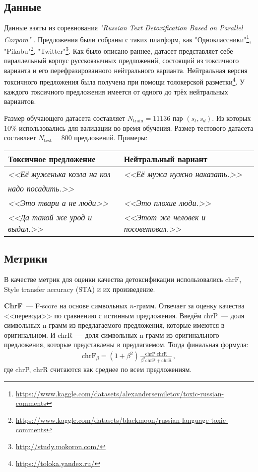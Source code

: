 \subsection{Данные}
Данные взяты из соревнования \textit{"Russian Text Detoxification Based on Parallel Corpora"} \cite{russe_data}.
Предложения были собраны с таких платформ, как 
"Одноклассники"\footnote{\url{https://www.kaggle.com/datasets/alexandersemiletov/toxic-russian-comments}}, 
"Pikabu"\footnote{\url{https://www.kaggle.com/datasets/blackmoon/russian-language-toxic-comments}}, 
"Twitter"\footnote{\url{http://study.mokoron.com/}}.
Как было описано раннее, датасет представляет себе параллельный корпус русскоязычных предложений, состоящий из токсичного варианта и его перефразированного нейтрального варианта. 
Нейтральная версия токсичного предложения была получена при помощи толокерской разметки\footnote{\url{https://toloka.yandex.ru/}}. 
У каждого токсичного предложения имеется от одного до трёх нейтральных вариантов. 

Размер обучающего датасета составляет $N_{\text{train}} = 11136$ пар $\left(s_t, s_d \right)$.
Из которых $10\%$ использовались для валидации во время обучения.
Размер тестового датасета составляет $N_{\text{test}} = 800$ предложений.
Примеры: 
\begin{table}[ht]
\centering
 \begin{tabular}{|l|l|} 
 \hline
 Токсичное предложение & Нейтральный вариант \\ [0.5ex] 
 \hline
 \textit{<<Её муженька козла на кол} & \textit{<<Её мужа нужно наказать.>>} \\
 \textit{надо посадить.>>} &  \\
 \textit{<<Это твари а не люди>>} & \textit{<<Это плохие люди.>>} \\
 \textit{<<Да такой же урод и выдал.>>} & \textit{<<Этот же человек и посоветовал.>>} \\
 \hline
 \end{tabular}
\end{table}

\subsection{Метрики}
В качестве метрик для оценки качества детоксификации использовались chrF\cite{popovic-2015-chrf}, Style transfer accuracy (STA) и их произведение.

\textbf{ChrF}~--- F-score на основе символьных $n$-грамм.
Отвечает за оценку качества <<перевода>> по сравнению с истинным предложения.
Введём chrP~--- доля символьных n-грамм из предлагаемого предложения, которые имеются в оригинальном.
И chrR~--- доля символьных n-грамм из оригинального предложения, которые представлены в предлагаемом. 
Тогда финальная формула:
\begin{gather*}
    \text{chrF}_{\beta} = (1 + \beta^2) \frac{\text{chrP} \cdot \text{chrR}}{\beta^2 \text{chrP} + \text{chrR}},
\end{gather*}
где chrP, chrR считаются как среднее по всем предложениям. 

